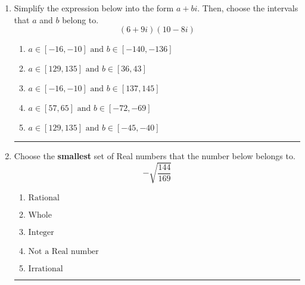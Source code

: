 \documentclass[14pt]{extbook}
\newcommand{\litem}[1]{\item#1\hspace*{-1cm}\rule{\textwidth}{0.4pt}}
\begin{document}
\begin{enumerate}
{\begin{enumerate}[label=\Alph*.]
\end{enumerate} }
\litem{
Simplify the expression below into the form $a+bi$. Then, choose the intervals that $a$ and $b$ belong to.\[ (6 + 9 i)(10 - 8 i) \]\begin{enumerate}[label=\Alph*.]
\item \( a \in [-16, -10] \text{ and } b \in [-140, -136] \)
\item \( a \in [129, 135] \text{ and } b \in [36, 43] \)
\item \( a \in [-16, -10] \text{ and } b \in [137, 145] \)
\item \( a \in [57, 65] \text{ and } b \in [-72, -69] \)
\item \( a \in [129, 135] \text{ and } b \in [-45, -40] \)

\end{enumerate} }
\litem{
Choose the \textbf{smallest} set of Real numbers that the number below belongs to.\[ -\sqrt{\frac{144}{169}} \]\begin{enumerate}[label=\Alph*.]
\item \( \text{Rational} \)
\item \( \text{Whole} \)
\item \( \text{Integer} \)
\item \( \text{Not a Real number} \)
\item \( \text{Irrational} \)

\end{enumerate} }
\end{enumerate}
\end{document}
